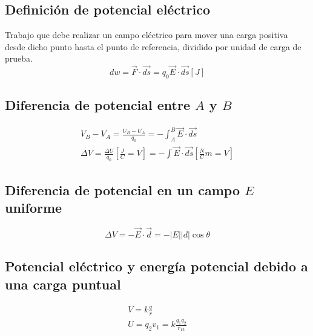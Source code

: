 \documentclass{report}
\begin{document}
    \subsection*{Definición de potencial eléctrico}
      Trabajo que debe realizar un campo eléctrico para mover una carga positiva desde dicho punto hasta el punto de 
      referencia, dividido por unidad de carga de prueba.
      \begin{equation*}
        dw=\vec{F}\cdot\vec{ds}=q_0\vec{E}\cdot\vec{ds}[J]
      \end{equation*}

    \subsection*{Diferencia de potencial entre $A$ y $B$}
      
      \begin{align*}
        V_B-V_A=\frac{U_B-U_A}{q_0}=-\int_A^B\vec{E}\cdot\vec{ds}\\
        \Delta V=\frac{\Delta U}{q_0}\left[\frac{J}{C}=V\right]=-\int\vec{E}\cdot\vec{ds}\left[\frac{N}{C}m=V\right]
      \end{align*}

    \subsection*{Diferencia de potencial en un campo $E$ uniforme}
      
      \begin{equation*}
        \Delta V=-\vec{E}\cdot\vec{d}=-|E||d|\cos{\theta}
      \end{equation*}

    \subsection*{Potencial eléctrico y energía potencial debido a una carga puntual}

      \begin{align*}
        V=k\frac{q}{r}\\
        U=q_2v_1=k\frac{q_1q_2}{r_{12}}
      \end{align*}
\end{document}
